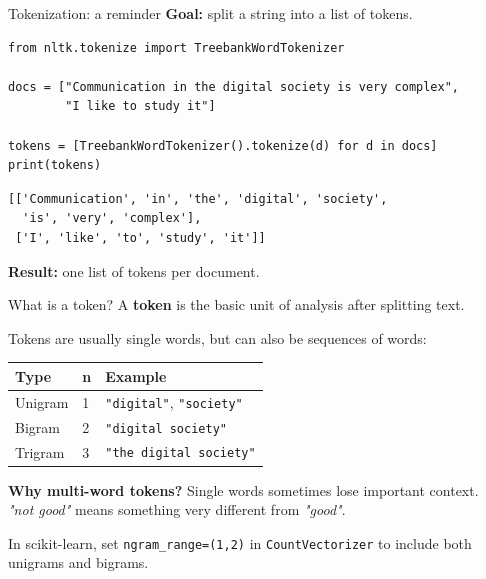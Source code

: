 \documentclass[handout]{beamer}
\begin{document}
\begin{frame}[fragile]{Tokenization: a reminder}
\textbf{Goal:} split a string into a list of tokens.

\begin{verbatim}
from nltk.tokenize import TreebankWordTokenizer

docs = ["Communication in the digital society is very complex",
        "I like to study it"]

tokens = [TreebankWordTokenizer().tokenize(d) for d in docs]
print(tokens)
\end{verbatim}

\pause

\begin{verbatim}
[['Communication', 'in', 'the', 'digital', 'society',
  'is', 'very', 'complex'],
 ['I', 'like', 'to', 'study', 'it']]
\end{verbatim}

\textbf{Result:} one list of tokens per document.
\end{frame}

\begin{frame}{What is a token?}
A \textbf{token} is the basic unit of analysis after splitting text.

\vspace{0.5em}
Tokens are usually single words, but can also be sequences of words:

\vspace{0.5em}
\begin{tabular}{lll}
    \textbf{Type} & \textbf{n} & \textbf{Example} \\
    \midrule
    Unigram & 1 & \texttt{"digital"}, \texttt{"society"} \\
    Bigram  & 2 & \texttt{"digital society"} \\
    Trigram & 3 & \texttt{"the digital society"} \\
\end{tabular}

\vspace{0.5em}
\textbf{Why multi-word tokens?} Single words sometimes lose important context.\\
\emph{"not good"} means something very different from \emph{"good"}.

\vspace{0.3em}
\small In scikit-learn, set \texttt{ngram\_range=(1,2)} in \texttt{CountVectorizer} to include both unigrams and bigrams.
\end{frame}
\end{document}
